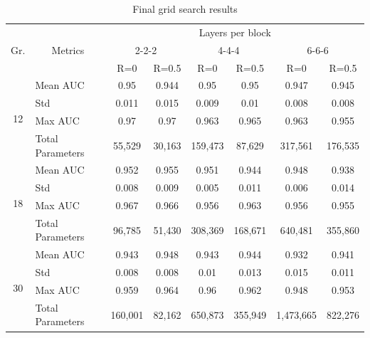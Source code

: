 \begin{center}
\begin{table}
 \begin{tabular}{|c|l|cc|cc|cc|}\hline \hline
  \multirow{3}{*}{Gr.} & \multicolumn{1}{c|}{\multirow{3}{*}{Metrics}} & \multicolumn{6}{c|}{Layers per block}  \\ \cline{3-8}
  & & \multicolumn{2}{c|}{2-2-2} & \multicolumn{2}{c|}{4-4-4} & \multicolumn{2}{c|}{6-6-6}\\ \cline{3-8}
  & & R=0 & R=0.5 & R=0 & R=0.5 & R=0 & R=0.5 \\ \hline \hline
  \multirow{4}{*}{12} & Mean AUC & \cellcolor{Gray}0.95 & \cellcolor{Gray}0.944 & \cellcolor{Gray}0.95 & \cellcolor{Gray}0.95 & \cellcolor{Gray}0.947 & \cellcolor{Gray}0.945 \\ %
   & Std & 0.011 & 0.015 & 0.009 & 0.01 & 0.008 & 0.008 \\ %
   & Max AUC & 0.97 & 0.97 & 0.963 & 0.965 & 0.963 & 0.955 \\ 
   & Total Parameters & 55,529 & 30,163 & 159,473 & 87,629 & 317,561 & 176,535 \\ \hline 
  \multirow{4}{*}{18} & Mean AUC & \cellcolor{Gray}0.952 & \cellcolor{Gray} 0.955 & \cellcolor{Gray} 0.951 & \cellcolor{Gray} 0.944 & \cellcolor{Gray} 0.948 &  \cellcolor{Gray} 0.938 \\ %
   & Std & 0.008 & 0.009 & 0.005 & 0.011 & 0.006 &  0.014 \\ %
   & Max AUC & 0.967 & 0.966 & 0.956 & 0.963 & 0.956 & 0.955 \\ 
   & Total Parameters & 96,785 & 51,430 & 308,369 & 168,671 & 640,481 & 355,860 \\\hline 
  \multirow{4}{*}{30} & Mean AUC & \cellcolor{Gray} 0.943 & \cellcolor{Gray} 0.948 & \cellcolor{Gray} 0.943 & \cellcolor{Gray} 0.944 & \cellcolor{Gray} 0.932 & \cellcolor{Gray} 0.941 \\ %
   & Std & 0.008 & 0.008 & 0.01 & 0.013 & 0.015 &  0.011 \\ %
   & Max AUC & 0.959 & 0.964 & 0.96 & 0.962 & 0.948 & 0.953 \\ 
   & Total Parameters & 160,001 & 82,162 & 650,873 & 355,949 & 1,473,665 & 822,276 \\ \hline
  \hline
 \end{tabular}
 \caption{Final grid search results}
\label{table:final_densenet_results}
\end{table}

\end{center}

